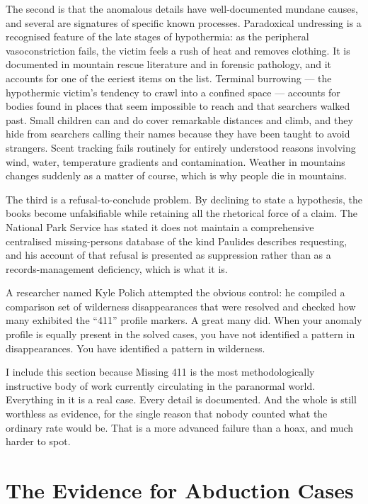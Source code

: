 The second is that the anomalous details have well-documented mundane causes, and several are
signatures of specific known processes. Paradoxical undressing is a recognised feature of the
late stages of hypothermia: as the peripheral vasoconstriction fails, the victim feels a rush
of heat and removes clothing. It is documented in mountain rescue literature and in forensic
pathology, and it accounts for one of the eeriest items on the list. Terminal burrowing --- the
hypothermic victim's tendency to crawl into a confined space --- accounts for bodies found in
places that seem impossible to reach and that searchers walked past. Small children can and do
cover remarkable distances and climb, and they hide from searchers calling their names because
they have been taught to avoid strangers. Scent tracking fails routinely for entirely
understood reasons involving wind, water, temperature gradients and contamination. Weather in
mountains changes suddenly as a matter of course, which is why people die in mountains.

The third is a refusal-to-conclude problem. By declining to state a hypothesis, the books
become unfalsifiable while retaining all the rhetorical force of a claim. The National Park
Service has stated it does not maintain a comprehensive centralised missing-persons database of
the kind Paulides describes requesting, and his account of that refusal is presented as
suppression rather than as a records-management deficiency, which is what it is.

\begin{funfact}
A researcher named Kyle Polich attempted the obvious control: he compiled a comparison set of
wilderness disappearances that were resolved and checked how many exhibited the ``411''
profile markers. A great many did. When your anomaly profile is equally present in the solved
cases, you have not identified a pattern in disappearances. You have identified a pattern in
wilderness.
\end{funfact}

I include this section because Missing 411 is the most methodologically instructive body of work
currently circulating in the paranormal world. Everything in it is a real case. Every detail is
documented. And the whole is still worthless as evidence, for the single reason that nobody
counted what the ordinary rate would be. That is a more advanced failure than a hoax, and much
harder to spot.

\section{The Evidence for Abduction Cases}\label{sec:evidenceabductioncases}

